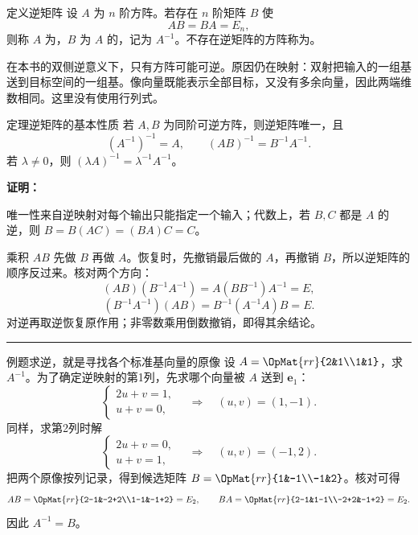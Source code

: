 \documentclass[a4paper,12pt,twoside,openany,fontset=none]{ctexbook}
\newcounter{theorem}[chapter]
\newenvironment{theorem}[1][]{\begin{thmBox}{定理}{#1}}{\end{thmBox}}
\newcounter{definition}[chapter]
\newenvironment{definition}[1][]{\begin{defBox}{定义}{#1}}{\end{defBox}}
\newcounter{example}[chapter]
\newenvironment{example}[1][]{\begin{exBox}{例题}{#1}}{\end{exBox}}
\renewenvironment{proof}{
    \par\vspace{0.5em}\noindent
    \textbf{\color{LogicColor} 证明：}
}{
    \hfill \textcolor{LogicColor}{\rule{0.6em}{0.6em}} \par
}
\numberwithin{equation}{chapter}
\begin{document}
\begin{definition}[逆矩阵]
设 $A$ 为 $n$ 阶方阵。若存在 $n$ 阶矩阵 $B$ 使
\[
 AB=BA=E_n,
\]
则称 $A$ 为，$B$ 为 $A$ 的，记为 $A^{-1}$。不存在逆矩阵的方阵称为。
\end{definition}

在本书的双侧逆意义下，只有方阵可能可逆。原因仍在映射：双射把输入的一组基送到目标空间的一组基。像向量既能表示全部目标，又没有多余向量，因此两端维数相同。这里没有使用行列式。

\begin{theorem}[逆矩阵的基本性质]
若 $A,B$ 为同阶可逆方阵，则逆矩阵唯一，且
\[
 (A^{-1})^{-1}=A,\qquad (AB)^{-1}=B^{-1}A^{-1}.
\]
若 $\lambda\ne0$，则 $(\lambda A)^{-1}=\lambda^{-1}A^{-1}$。
\end{theorem}

\begin{proof}
唯一性来自逆映射对每个输出只能指定一个输入；代数上，若 $B,C$ 都是 $A$ 的逆，则 $B=B(AC)=(BA)C=C$。

乘积 $AB$ 先做 $B$ 再做 $A$。恢复时，先撤销最后做的 $A$，再撤销 $B$，所以逆矩阵的顺序反过来。核对两个方向：
\[
 (AB)(B^{-1}A^{-1})=A(BB^{-1})A^{-1}=E,
\]
\[
 (B^{-1}A^{-1})(AB)=B^{-1}(A^{-1}A)B=E.
\]
对逆再取逆恢复原作用；非零数乘用倒数撤销，即得其余结论。
\end{proof}


\begin{example}[求逆，就是寻找各个标准基向量的原像]
设 $A=\OpMat{rr}{2&1\\1&1}$，求 $A^{-1}$。为了确定逆映射的第1列，先求哪个向量被 $A$ 送到 $\boldsymbol e_1$：
\[
 \begin{cases}2u+v=1,\\u+v=0,\end{cases}
 \quad\Longrightarrow\quad (u,v)=(1,-1).
\]
同样，求第2列时解
\[
 \begin{cases}2u+v=0,\\u+v=1,\end{cases}
 \quad\Longrightarrow\quad (u,v)=(-1,2).
\]
把两个原像按列记录，得到候选矩阵 $B=\OpMat{rr}{1&-1\\-1&2}$。核对可得
\[
 AB=\OpMat{rr}{2-1&-2+2\\1-1&-1+2}=E_2,\qquad
 BA=\OpMat{rr}{2-1&1-1\\-2+2&-1+2}=E_2.
\]
因此 $A^{-1}=B$。
\end{example}
\end{document}
